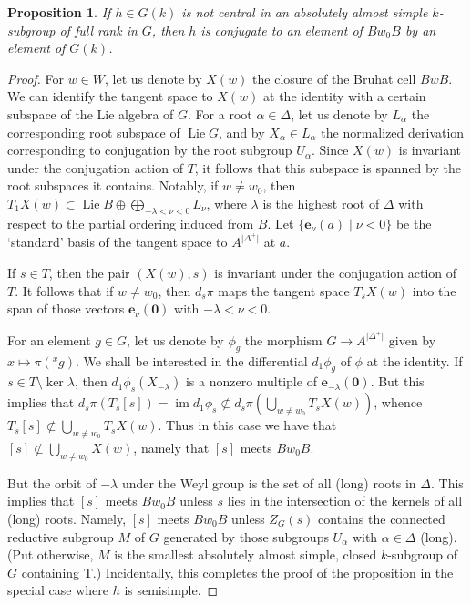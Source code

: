 \documentclass{amsart}
\theoremstyle{plain}
\newtheorem{proposition}[theorem]{Proposition}
\theoremstyle{definition}
\theoremstyle{remark}
\DeclareMathOperator{\Lie}{Lie}
\newcommand{\Vect}[1]{\mathbold{#1}}
\providecommand{\abs}[1]{\lvert#1\rvert}
\begin{document}
\begin{proposition}\label{prop:conjtobigcell}
If $h \in G(k)$ is not central in an absolutely almost simple $k$-subgroup of full rank in
$G$, then $h$ is conjugate to an element of $Bw_{0}B$ by an element of $G(k)$.
\end{proposition}
\begin{proof}
For $w \in W$, let us denote by $X(w)$ the closure of the Bruhat cell $BwB$. We can identify the tangent space to
$X(w)$ at the identity with a certain subspace of the Lie algebra of $G$. For a root $\alpha \in \Delta$, let us denote by $L_{\alpha}$ the
corresponding root subspace of $\Lie G$, and by $X_{\alpha}
\in L_{\alpha}$ the normalized derivation corresponding to conjugation by the root subgroup $U_{\alpha}$. Since $X(w)$ is invariant under the conjugation action
of $T$, it follows that this subspace is spanned by the root subspaces it contains. Notably, if $w \neq w_{0}$, then $T_{1}
X(w) \subset \Lie B \oplus \bigoplus_{-\lambda < \nu < 0} L_{\nu}$, where $\lambda$ is the highest
root of $\Delta$ with respect to the partial ordering induced from
$B$. Let $\{\Vect{e}_{\nu}(a) \mid \nu < 0\}$ be the `standard' basis of the tangent space to $A^{\abs{\Delta^{+}}}$ at $a$.

If $s \in
T$, then the pair $(X(w), s)$ is invariant under the conjugation action of
$T$. It follows that if $w \neq w_{0}$, then $d_{s}\pi$ maps the tangent space $T_{s} X(w)$ into the span of those vectors $\Vect{e}_{\nu}(\Vect{0})$ with $-\lambda < \nu < 0$.

For an element $g \in G$, let us denote by $\phi_{g}$ the morphism $G \to A^{\abs{\Delta^{+}}}$ given by $x \mapsto \pi(\mbox{}^{x}g)$. We shall be interested in the differential $d_{1}\phi_{g}$ of $\phi$ at the identity. If $s \in T \setminus \ker \lambda$, then $d_{1}\phi_{s}(X_{-\lambda})$ is a nonzero multiple of $\Vect{e}_{-\lambda}(\Vect{0})$. But this implies that $d_{s}\pi(T_{s}[s]) = \operatorname{im} d_{1}\phi_{s} \not\subset d_{s}\pi(\bigcup_{w \neq w_{0}} T_{s} X(w))$, whence 
$T_{s}[s] \not\subset \bigcup_{w \neq w_{0}} T_{s} X(w)$. Thus in this case we have that $[s] \not\subset \bigcup_{w \neq w_{0}} X(w)$, namely that $[s]$ meets $Bw_{0}B$.

But the orbit of $-\lambda$ under the Weyl group is the set of all (long) roots in $\Delta$. This implies that $[s]$ meets $Bw_{0}B$ unless $s$ lies in the intersection of the kernels of all (long)
roots. Namely, $[s]$ meets $Bw_{0}B$ unless $Z_{G}(s)$ contains
the connected reductive subgroup $M$ of $G$
generated by those subgroups $U_{\alpha}$ with $\alpha \in \Delta$ (long).
(Put otherwise, $M$ is the smallest absolutely almost simple, closed $k$-subgroup of $G$
containing T.)
Incidentally,
this completes the proof of the proposition in the special case where $h$ is semisimple.


\end{proof}
\end{document}
